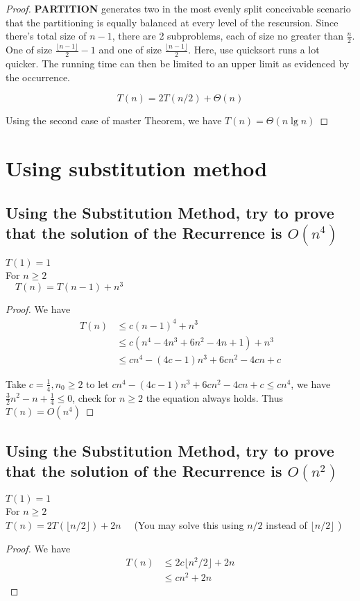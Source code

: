 \documentclass[a4paper]{article}
\begin{document}
\begin{proof}
  \textbf{PARTITION} generates two in the most evenly split conceivable scenario that the partitioning is equally balanced at every level of the rescursion. Since there's total size of $n - 1$, there are 2 subproblems, each of size no greater than $\frac{n}2$. One of size $\frac{\lfloor n - 1\rfloor}2 - 1 $ and one of size $\frac{\lfloor n - 1\rfloor}2$. Here, use quicksort runs a lot quicker. The running time can then be limited to an upper limit as evidenced by the occurrence.

  $$T(n)=2 T(n / 2)+\Theta(n)$$

  Using the second case of master Theorem, we have $T(n)=\Theta(n \lg n)$
\end{proof}

\section{Using substitution method}

\subsection{Using the Substitution Method, try to prove that the solution of the Recurrence is $O(n^4)$}
$T(1)=1$\\
For $n \geq 2$\\
$\quad T(n)=T(n-1)+n^3$
\begin{proof}
We have 
$$\begin{aligned} T(n) & \leq c(n-1)^4+n^3 
  \\ & \leq c(n^4-4n^3+6n^2-4n +1)+ n^3 
  \\ & \leq cn^4-(4c-1)n^3+6cn^2-4cn +c
 \end{aligned}$$

 Take $c=\frac 14,n_0\geq 2$ to let $cn^4-(4c-1)n^3+6cn^2-4cn+c\leq cn^4$, we have $\frac 3 2 n^2-n+\frac 14\leq0$, check for $n\geq 2$ the equation always holds. Thus $T(n)=O(n^4)$
\end{proof}
\subsection{Using the Substitution Method, try to prove that the solution of the Recurrence is $O(n^2)$}
$T(1)=1$ \\For $n \geq 2$\\
$T(n)=2 T(\lfloor n / 2\rfloor)+2 n \quad$ (You may solve this using $n / 2$ instead of $\lfloor n / 2\rfloor$ )
\begin{proof}
We have
$$\begin{aligned} T(n) & \leq 2c\lfloor n^2 / 2\rfloor+2n 
  \\ & \leq cn^2+2n
 \end{aligned}$$
  \end{proof}
\end{document}

